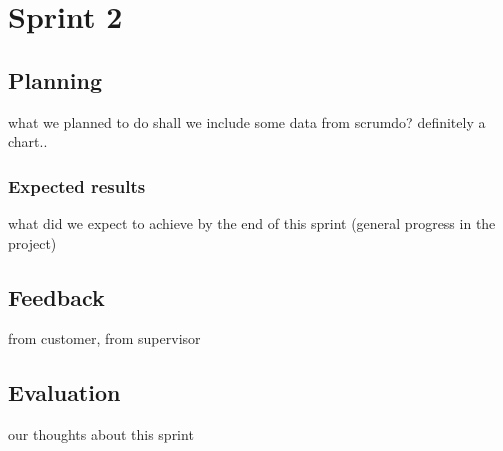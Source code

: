 
\chapter{Sprint 2} %

\label{Sprint 2} %


\section{Planning}
what we planned to do
shall we include some data from scrumdo? definitely a chart..
\subsection{Expected results}
what did we expect to achieve by the end of this sprint (general progress in the project)
\section{Feedback}
from customer, from supervisor
\section{Evaluation}
our thoughts about this sprint